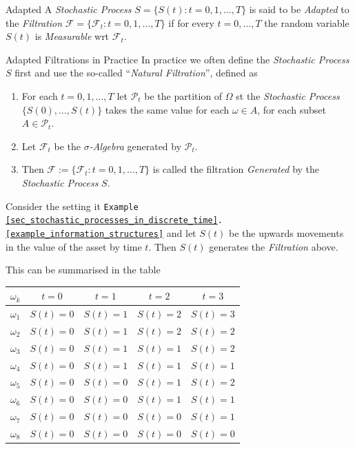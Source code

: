 \documentclass[11pt,a4paper]{article}
\begin{document}
  \begin{definition}{Adapted}
    A \textit{Stochastic Process} $S=\{S(t):t=0,1,\dots,T\}$ is said to be \textit{Adapted} to the \textit{Filtration} $\mathcal{F}=\{\mathcal{F}_t:t=0,1,\dots,T\}$ if for every $t=0,\dots,T$ the random variable $S(t)$ is \textit{Measurable} wrt $\mathcal{F}_t$.
  \end{definition}

  \begin{remark}{Adapted Filtrations in Practice}
    In practice we often define the \textit{Stochastic Process} $S$ first and use the so-called ``\textit{Natural Filtration}'', defined as
    \begin{enumerate}
      \item For each $t=0,1,\dots,T$ let $\mathcal{P}_t$ be the partition of $\Omega$ st the \textit{Stochastic Process} $\{S(0),\dots,S(t)\}$ takes the same value for each $\omega\in A$, for each subset $A\in\mathcal{P}_t$.
      \item Let $\mathcal{F}_t$ be the \textit{$\sigma$-Algebra} generated by $\mathcal{P}_t$.
      \item Then $\mathcal{F}:=\{\mathcal{F}_t:t=0,1,\dots,T\}$ is called the filtration \textit{Generated} by the \textit{Stochastic Process} $S$.
    \end{enumerate}
  \end{remark}

  \begin{example}{}\label{example_2_13}
    Consider the setting it \texttt{Example \ref{sec_stochastic_processes_in_discrete_time}.\ref{example_information_structures}} and let $S(t)$ be the upwards movements in the value of the asset by time $t$. Then $S(t)$ generates the \textit{Filtration} above.
    \par This can be summarised in the table
    \begin{center}
      \begin{tabular}{c|cccc}
        $\omega_k$&$t=0$&$t=1$&$t=2$&$t=3$\\\hline
        $\omega_1$&$S(t)=0$&$S(t)=1$&$S(t)=2$&$S(t)=3$\\
        $\omega_2$&$S(t)=0$&$S(t)=1$&$S(t)=2$&$S(t)=2$\\
        $\omega_3$&$S(t)=0$&$S(t)=1$&$S(t)=1$&$S(t)=2$\\
        $\omega_4$&$S(t)=0$&$S(t)=1$&$S(t)=1$&$S(t)=1$\\
        $\omega_5$&$S(t)=0$&$S(t)=0$&$S(t)=1$&$S(t)=2$\\
        $\omega_6$&$S(t)=0$&$S(t)=0$&$S(t)=1$&$S(t)=1$\\
        $\omega_7$&$S(t)=0$&$S(t)=0$&$S(t)=0$&$S(t)=1$\\
        $\omega_8$&$S(t)=0$&$S(t)=0$&$S(t)=0$&$S(t)=0$
      \end{tabular}
    \end{center}
  \end{example}
\end{document}

